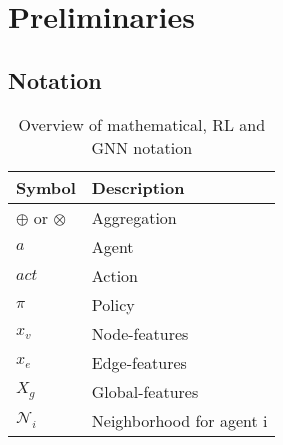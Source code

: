 
\chapter{Preliminaries}
\label{ch:Preliminaries}

\section{Notation}

\newcommand{\agent}{a}
\newcommand{\actions}{A}
\newcommand{\action}{act}
\newcommand{\policy}{pi}
\newcommand{\advantage}{A}
\newcommand{\graph}{G}
\newcommand{\nodes}{V}
\newcommand{\node}{v}
\newcommand{\nodefeatures}{X_v}
\newcommand{\nodefeature}{x_v}
\newcommand{\edges}{E}
\newcommand{\edge}{e}
\newcommand{\edgefeatures}{X_e}
\newcommand{\edgefeature}{x_e}
\newcommand{\globalfeatures}{X_g}
\newcommand{\globalfeature}{x_g}
\newcommand{\neighborhood}{N}

\begin{table}[ht!]
	\caption{Overview of mathematical, RL and GNN notation}
	\vspace*{0.5cm}
	\centering
	\begin{tabular}{ll}
		\toprule
		Symbol & Description \\
		\midrule
		$\oplus$ or $\otimes$ & Aggregation \\
		\midrule
		$\agent$ & Agent \\
		$\action$ & Action \\
		$\pi$ & Policy \\
		\midrule
		$\nodefeature$ & Node-features \\
		$\edgefeature$ & Edge-features \\
		$\globalfeatures$ & Global-features \\
		$\mathcal{\neighborhood}_i$ & Neighborhood for agent i \\
		\bottomrule
	\end{tabular}
	\label{tab:macros}
\end{table}



